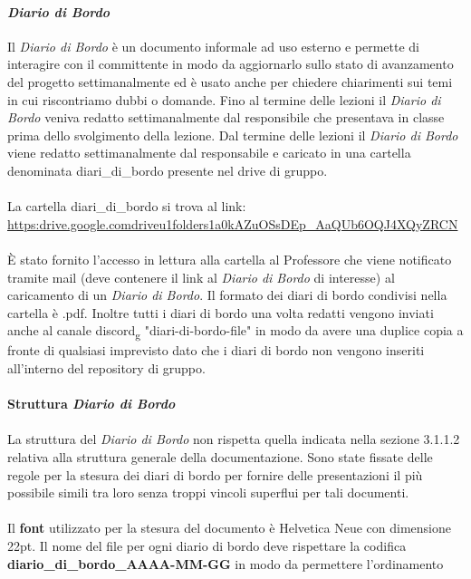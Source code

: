 \paragraph{\textit{Diario di Bordo}}
Il \textit{Diario di Bordo} è un documento informale ad uso esterno e permette di interagire con il committente in modo da aggiornarlo sullo stato di avanzamento del progetto settimanalmente ed è usato 
anche per chiedere chiarimenti sui temi in cui riscontriamo dubbi o domande.
Fino al termine delle lezioni il \textit{Diario di Bordo} veniva redatto settimanalmente dal responsibile che presentava in classe prima dello svolgimento 
della lezione.
Dal termine delle lezioni il \textit{Diario di Bordo} viene redatto settimanalmente dal responsabile e caricato in una cartella denominata diari\_di\_bordo presente nel drive di gruppo.
\\\\
La cartella diari\_di\_bordo si trova al link: \href{https://drive.google.com/drive/u/1/folders/1a0kAZuOSsDEp_AaQUb6OQJ4XQyZ--RCN}{\\https:\/\/drive.google.com\/drive\/u\/1\/folders\/1a0kAZuOSsDEp\_AaQUb6OQJ4XQyZ\-\-RCN}
\\\\
È stato fornito l'accesso in lettura alla cartella al Professore che viene notificato tramite mail (deve contenere il link al \textit{Diario di Bordo} di interesse) al caricamento di un \textit{Diario di Bordo}.
Il formato dei diari di bordo condivisi nella cartella è .pdf.
Inoltre tutti i diari di bordo una volta redatti vengono inviati anche al canale discord\textsubscript{g} "diari-di-bordo-file" in modo da avere una duplice copia a fronte di 
qualsiasi imprevisto dato che i diari di bordo non vengono inseriti all'interno del repository di gruppo.
\\\\
\textbf{Struttura \textit{Diario di Bordo}} 
\\\\
La struttura del \textit{Diario di Bordo} non rispetta quella indicata nella sezione 3.1.1.2 relativa alla struttura generale della documentazione.
Sono state fissate delle regole per la stesura dei diari di bordo per fornire delle presentazioni il più possibile simili tra loro 
senza troppi vincoli superflui per tali documenti.
\\\\
Il \textbf{font} utilizzato per la stesura del documento è Helvetica Neue con dimensione 22pt.
Il nome del file per ogni diario di bordo deve rispettare la codifica \textbf{diario\_di\_bordo\_AAAA-MM-GG} in modo da permettere l'ordinamento
